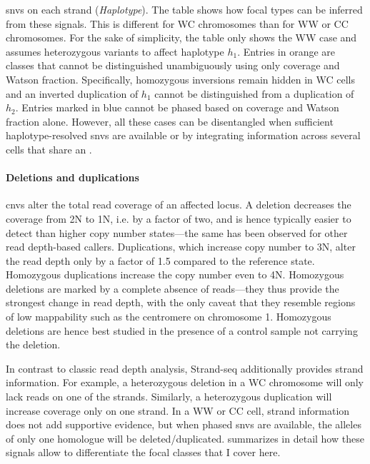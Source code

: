 \begin{table}[t]
{    \acp{snv} on each strand (\emph{Haplotype}). The table shows how
    focal \sv types can be inferred from these signals. This is different
    for WC chromosomes than for WW or CC chromosomes. For the sake of simplicity,
    the table only shows the WW case and assumes heterozygous variants to affect
    haplotype $h_1$. Entries in orange are \sv classes that cannot be
    distinguished unambiguously using only coverage and Watson fraction.
    Specifically, homozygous inversions remain hidden in WC cells and an
    inverted duplication of $h_1$ cannot be distinguished from a duplication of
    $h_2$. Entries marked in blue cannot be phased based on coverage and Watson
    fraction alone. However, all these cases can be disentangled when
    sufficient haplotype-resolved \acp{snv} are available or by integrating information
    across several cells that share an \sv.}
\end{table}

\paragraph{Deletions and duplications}
\Acp{cnv} alter the total read coverage of an affected locus. A deletion
decreases the coverage from 2N to 1N, i.e. by a factor of two, and is hence
typically easier to detect than higher copy number states---the same has been observed for other read
depth-based \sv callers. Duplications, which increase copy number to 3N, alter
the read depth only by a factor of 1.5 compared to the reference state.
Homozygous duplications increase the copy number even to 4N. Homozygous
deletions are marked by a complete absence of reads---they thus provide the
strongest change in read depth, with the only caveat that they resemble regions
of low mappability such as the centromere on chromosome 1. Homozygous deletions
are hence best studied in the presence of a control sample not carrying
the deletion.

In contrast to classic read depth analysis, Strand-seq additionally provides
strand information. For example, a heterozygous deletion in a WC chromosome will
only lack reads on one of the strands. Similarly, a heterozygous duplication
will increase coverage only on one strand. In a WW or CC cell, strand
information does not add supportive evidence, but when phased \acp{snv} are
available, the alleles of only one homologue will be deleted/duplicated.
 summarizes in detail how these signals
allow to differentiate the focal \sv classes that I cover here.


